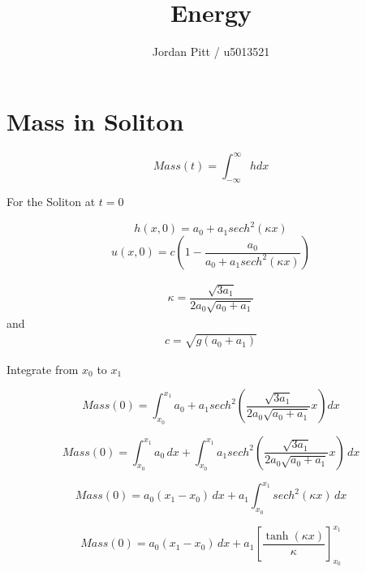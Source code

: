 \documentclass[12pt]{article}
\begin{document}
\title{Energy}
\author{Jordan Pitt / u5013521}

\section{Mass in Soliton}

\[Mass (t) = \int_{-\infty}^{\infty} h dx \]

For the Soliton at $t = 0 $

\[h(x,0) = a_0 + a_1 sech^2\left(\kappa x\right)\]
\[u(x,0) = c\left(1 - \frac{a_0}{a_0 + a_1 sech^2\left(\kappa x\right)}\right)\]


\begin{gather}
\kappa = \dfrac{\sqrt{3a_1}}{2a_0 \sqrt{ a_0 + a_1}}
\end{gather}
and
\begin{gather}
c = \sqrt{g \left(a_0 + a_1\right)}
\end{gather}

Integrate from $x_0$ to $x_1$

\[Mass (0) = \int_{x_0}^{x_1} a_0 + a_1 sech^2\left(\dfrac{\sqrt{3a_1}}{2a_0 \sqrt{ a_0 + a_1}} x\right) dx \]

\[Mass (0) = \int_{x_0}^{x_1} a_0 \, dx  +  \int_{x_0}^{x_1}a_1 sech^2\left(\dfrac{\sqrt{3a_1}}{2a_0 \sqrt{ a_0 + a_1}} x\right) \, dx \]

\[Mass (0) = a_0\left(x_1 - x_0\right) \, dx  +  a_1\int_{x_0}^{x_1} sech^2\left(\kappa x\right) \, dx \]

\[Mass (0) = a_0\left(x_1 - x_0\right) \, dx  +  a_1 \left[\frac{\tanh\left(\kappa x\right)}{\kappa}\right]_{x_0}^{x_1}\]
\end{document}
